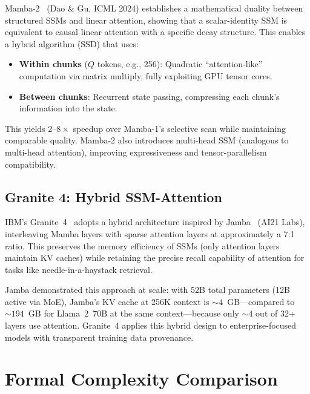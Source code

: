 \documentclass[11pt,letterpaper]{article}
\begin{document}
Mamba-2~\cite{mamba2} (Dao \& Gu, ICML 2024) establishes a mathematical duality between structured SSMs and linear attention, showing that a scalar-identity SSM is equivalent to causal linear attention with a specific decay structure. This enables a hybrid algorithm (SSD) that uses:

\begin{itemize}[noitemsep]
    \item \textbf{Within chunks} ($Q$ tokens, e.g., 256): Quadratic ``attention-like'' computation via matrix multiply, fully exploiting GPU tensor cores.
    \item \textbf{Between chunks}: Recurrent state passing, compressing each chunk's information into the state.
\end{itemize}

This yields 2--$8\times$ speedup over Mamba-1's selective scan while maintaining comparable quality. Mamba-2 also introduces multi-head SSM (analogous to multi-head attention), improving expressiveness and tensor-parallelism compatibility.

\subsection{Granite 4: Hybrid SSM-Attention}

IBM's Granite~4~\cite{granite} adopts a hybrid architecture inspired by Jamba~\cite{jamba} (AI21 Labs), interleaving Mamba layers with sparse attention layers at approximately a 7:1 ratio. This preserves the memory efficiency of SSMs (only attention layers maintain KV caches) while retaining the precise recall capability of attention for tasks like needle-in-a-haystack retrieval.

Jamba demonstrated this approach at scale: with 52B total parameters (12B active via MoE), Jamba's KV cache at 256K context is ${\sim}4$~GB---compared to ${\sim}194$~GB for Llama~2~70B at the same context---because only ${\sim}4$ out of 32+ layers use attention. Granite~4 applies this hybrid design to enterprise-focused models with transparent training data provenance.

\section{Formal Complexity Comparison}
\label{sec:complexity}
\end{document}
